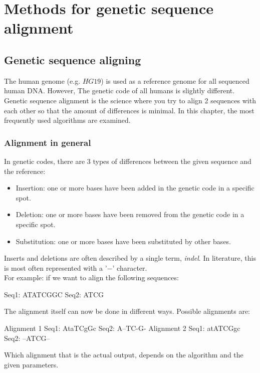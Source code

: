 
\chapter{Methods for genetic sequence alignment}
\label{ch:algoverzicht}


\section{Genetic sequence aligning}

The human genome (e.g. $HG19$) is used as a reference genome for all sequenced human DNA. However, The genetic code of all humans is slightly different. Genetic sequence alignment is the science where you try to align 2 sequences with each other so that the amount of differences is minimal. In this chapter, the most frequently used algorithms are examined.

\subsection{Alignment in general}

In genetic codes, there are 3 types of differences between the given sequence and the reference:

\begin{itemize}
	\item Insertion: one or more bases have been added in the genetic code in a specific spot.
	\item Deletion: one or more bases have been removed from the genetic code in a specific spot.
	\item Substitution: one or more bases have been substituted by other bases.
\end{itemize}

Inserts and deletions are often described by a single term, \emph{indel}. In literature, this is most often represented with a '$-$' character.\\

For example: if we want to align the following sequences:
\begin{lcverbatim}
Seq1: ATATCGGC
Seq2: ATCG
\end{lcverbatim}
The alignment itself can now be done in different ways. Possible alignments are:
\begin{lcverbatim}
Alignment 1
Seq1: AtaTCgGc
Seq2: A--TC-G-
Alignment 2
Seq1: atATCGgc
Seq2: --ATCG--
\end{lcverbatim}
Which alignment that is the actual output, depends on the algorithm and the given parameters.\\

